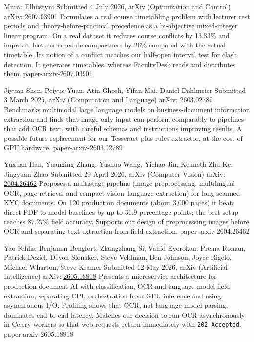 {Murat Elhüseyni}
{Submitted 4 July 2026, arXiv (Optimization and Control)}
{arXiv: \href{https://arxiv.org/abs/2607.03901}{2607.03901}}
{Formulates a real course timetabling problem with lecturer rest periods and theory-before-practical precedence as a bi-objective mixed-integer linear program. On a real dataset it reduces course conflicts by 13.33\% and improves lecturer schedule compactness by 26\% compared with the actual timetable.}
{Its notion of a conflict matches our half-open interval test for clash detection. It generates timetables, whereas FacultyDesk reads and distributes them.}
{paper-arxiv-2607.03901}

{Jiyuan Shen, Peiyue Yuan, Atin Ghosh, Yifan Mai, Daniel Dahlmeier}
{Submitted 3 March 2026, arXiv (Computation and Language)}
{arXiv: \href{https://arxiv.org/abs/2603.02789}{2603.02789}}
{Benchmarks multimodal large language models on business-document information extraction and finds that image-only input can perform comparably to pipelines that add OCR text, with careful schemas and instructions improving results.}
{A possible future replacement for our Tesseract-plus-rules extractor, at the cost of GPU hardware.}
{paper-arxiv-2603.02789}

{Yuxuan Han, Yuanxing Zhang, Yushuo Wang, Yichao Jin, Kenneth Zhu Ke, Jingyuan Zhao}
{Submitted 29 April 2026, arXiv (Computer Vision)}
{arXiv: \href{https://arxiv.org/abs/2604.26462}{2604.26462}}
{Proposes a multistage pipeline (image preprocessing, multilingual OCR, page retrieval and compact vision--language extraction) for long scanned KYC documents. On 120 production documents (about 3,000 pages) it beats direct PDF-to-model baselines by up to 31.9 percentage points; the best setup reaches 87.27\% field accuracy.}
{Supports our design of preprocessing images before OCR and separating text extraction from field extraction.}
{paper-arxiv-2604.26462}

{Yao Fehlis, Benjamin Bengfort, Zhangzhang Si, Vahid Eyorokon, Prema Roman, Patrick Deziel, Devon Slonaker, Steve Veldman, Ben Johnson, Joyce Rigelo, Michael Wharton, Steve Kramer}
{Submitted 12 May 2026, arXiv (Artificial Intelligence)}
{arXiv: \href{https://arxiv.org/abs/2605.18818}{2605.18818}}
{Presents a microservice architecture for production document AI with classification, OCR and language-model field extraction, separating CPU orchestration from GPU inference and using asynchronous I/O. Profiling shows that OCR, not language-model parsing, dominates end-to-end latency.}
{Matches our decision to run OCR asynchronously in Celery workers so that web requests return immediately with \texttt{202 Accepted}.}
{paper-arxiv-2605.18818}

